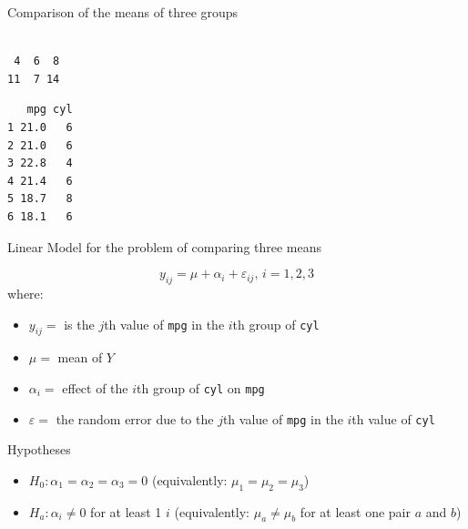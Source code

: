 \begin{frame}[fragile]{Comparison of the means of three groups}

\begin{Shaded}
\begin{Highlighting}[]
\OperatorTok{$}
\end{Highlighting}
\end{Shaded}

\begin{verbatim}

 4  6  8 
11  7 14 
\end{verbatim}

\begin{Shaded}
\end{Shaded}

\begin{verbatim}
   mpg cyl
1 21.0   6
2 21.0   6
3 22.8   4
4 21.4   6
5 18.7   8
6 18.1   6
\end{verbatim}

\end{frame}

\begin{frame}[fragile]{Linear Model for the problem of comparing three
means}

\[ y_{ij} = \mu + \alpha_i + \varepsilon_{ij},\, i = 1, 2, 3\] where:

\begin{itemize}
\tightlist
\item
  \(y_{ij}=\) is the \(j\)th value of \texttt{mpg} in the \(i\)th group
  of \texttt{cyl}
\item
  \(\mu=\) mean of \(Y\)
\item
  \(\alpha_i = \) effect of the \(i\)th group of \texttt{cyl} on
  \texttt{mpg}
\item
  \(\varepsilon=\) the random error due to the \(j\)th value of
  \texttt{mpg} in the \(i\)th value of \texttt{cyl}
\end{itemize}

\begin{block}{Hypotheses}

\begin{itemize}
\tightlist
\item
  \(H_0:\alpha_1=\alpha_2=\alpha_3=0\) (equivalently:
  \(\mu_1=\mu_2=\mu_3\))
\item
  \(H_a:\alpha_i\neq 0\) for at least 1 \(i\) (equivalently:
  \(\mu_a\neq \mu_b\) for at least one pair \(a\) and \(b\))
\end{itemize}

\end{block}

\end{frame}

